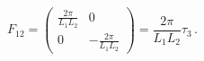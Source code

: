 \begin{equation}
F_{12} = \left(\begin{array}{cc}
\frac{2 \pi}{ L_1 L_2}  & 0\\
0 &-\frac{2 \pi}{ L_1 L_2} 
\end{array}\right)
= \frac{2 \pi}{ L_1 L_2}  \tau_3 \,.
\end{equation}

